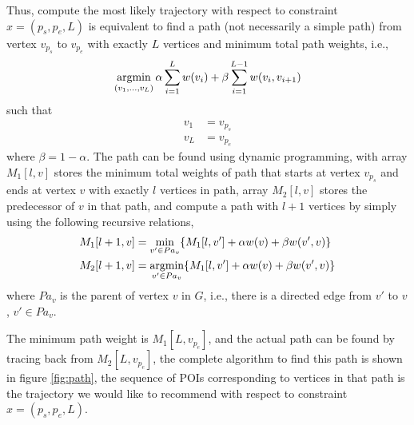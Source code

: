 Thus, compute the most likely trajectory with respect to constraint $x = (p_s, p_e, L)$ is
equivalent to find a path (not necessarily a simple path) from vertex $v_{p_s}$ to
$v_{p_e}$ with exactly $L$ vertices and minimum total path weights,
i.e.,
\begin{displaymath}
    \operatorname*{argmin}_{(v_1, \dots, v_L)} \alpha \sum_{i=1}^{L} w(v_i) + \beta \sum_{i=1}^{L-1} w(v_i, v_{i+1})
\end{displaymath}
such that
\begin{align*}
    v_1 &= v_{p_s} \\
    v_L &= v_{p_e} 
\end{align*}
where $\beta = 1 - \alpha$.
The path can be found using dynamic programming, 
with array $M_1[l, v]$ stores the minimum total weights of path 
that starts at vertex $v_{p_s}$ and ends at vertex $v$ with 
exactly $l$ vertices in path,
array $M_2[l, v]$ stores the predecessor of $v$ in that path,
and compute a path with $l+1$ vertices by simply using the following recursive relations,
\begin{align*}
    M_1[l+1, v] &= \min_{v' \in Pa_v} \{ M_1[l, v'] + \alpha w(v) + \beta w(v', v) \} \\
    M_2[l+1, v] &= \operatorname*{argmin}_{v' \in Pa_v} \{ M_1[l, v'] + \alpha w(v) + \beta w(v', v) \} 
\end{align*}
where $Pa_v$ is the parent of vertex $v$ in $G$,
i.e., 
there is a directed edge from $v'$ to $v$, $v' \in Pa_v$.

The minimum path weight is $M_1[L, v_{p_e}]$,
and the actual path can be found by tracing back from $M_2[L, v_{p_e}]$,
the complete algorithm to find this path is shown in figure \ref{fig:path},
the sequence of POIs corresponding to vertices in that path is the 
trajectory we would like to recommend with respect to constraint $ x = (p_s, p_e, L)$.

